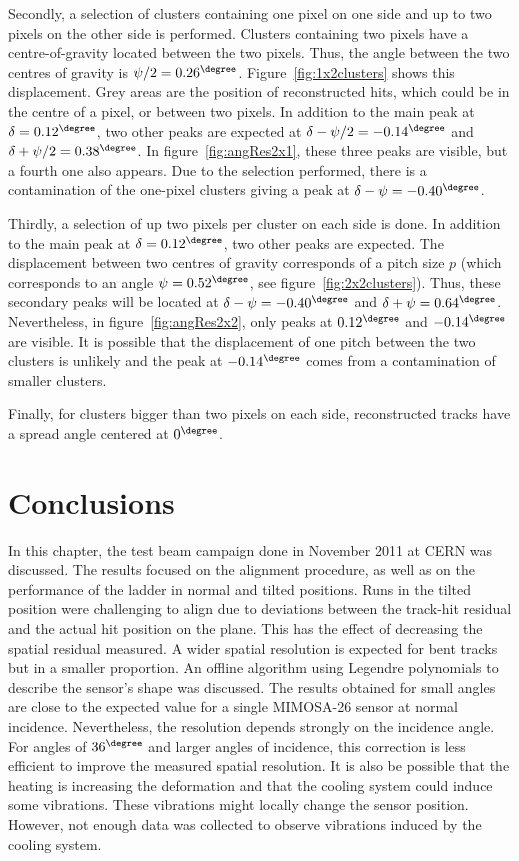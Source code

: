    Secondly, a selection of clusters containing one pixel on one side and up to two pixels on the other side is performed.
   Clusters containing two pixels have a centre-of-gravity located between the two pixels.
   Thus, the angle between the two centres of gravity is $\psi/2 = 0.26^{\degree}$.
   Figure~\ref{fig:1x2clusters} shows this displacement. 
   Grey areas are the position of reconstructed hits, which could be in the centre of a pixel, or between two pixels. 
   In addition to the main peak at $\delta = 0.12^{\degree}$, two other peaks are expected at $\delta - \psi/2 = -0.14^{\degree}$ and $\delta + \psi/2 = 0.38^{\degree}$.
   In figure~\ref{fig:angRes2x1}, these three peaks are visible, but a fourth one also appears. 
   Due to the selection performed, there is a contamination of the one-pixel clusters giving a peak at $\delta - \psi = -0.40^{\degree}$.

   Thirdly, a selection of up two pixels per cluster on each side is done.
   In addition to the main peak at $\delta = 0.12^{\degree}$, two other peaks are expected.
   The displacement between two centres of gravity corresponds of a pitch size $p$ (which corresponds to an angle $\psi = 0.52^{\degree}$, see figure~\ref{fig:2x2clusters}).
   Thus, these secondary peaks will be located at $\delta - \psi = -0.40^{\degree}$ and $\delta + \psi = 0.64^{\degree}$.
   Nevertheless, in figure~\ref{fig:angRes2x2}, only peaks at $0.12^{\degree}$ and $-0.14^{\degree}$ are visible.
   It is possible that the displacement of one pitch between the two clusters is unlikely and the peak at $-0.14^{\degree}$ comes from a contamination of smaller clusters.

   Finally, for clusters bigger than two pixels on each side, reconstructed tracks have a spread angle centered at $0^{\degree}$.
   
  \section{Conclusions}

  In this chapter, the test beam campaign done in November 2011 at \gls{CERN} was discussed. 
  The results focused on the alignment procedure, as well as on the performance of the ladder in normal and tilted positions.
  Runs in the tilted position were challenging to align due to deviations between the track-hit residual and the actual hit position on the plane.
  This has the effect of decreasing the spatial residual measured.
  A wider spatial resolution is expected for bent tracks but in a smaller proportion.
  An offline algorithm using Legendre polynomials to describe the sensor's shape was discussed.
  The results obtained for small angles are close to the expected value for a single \gls{MIMOSA}-26 sensor at normal incidence. 
  Nevertheless, the resolution depends strongly on the incidence angle.
  For angles of $36^{\degree}$ and larger angles of incidence, this correction is less efficient to improve the measured spatial resolution.
  It is also be possible that the heating is increasing the deformation and that the cooling system could induce some vibrations.
  These vibrations might locally change the sensor position.
  However, not enough data was collected to observe vibrations induced by the cooling system.

